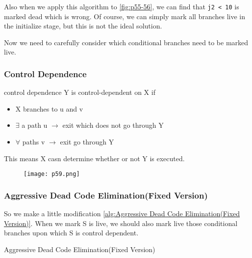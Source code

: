 Also when we apply this algorithm to \ref{fig:p55-56}, we can find that \texttt{j2 < 10} is marked dead which is wrong. Of course,
we can simply mark all branches live in the initialize stage, but this is not the ideal solution.


Now we need to carefully consider which conditional branches need to be marked live. 



\subsubsection{Control Dependence}

\begin{definition}{control dependence}
Y is control-dependent on X if
\begin{itemize}
    \item X branches to u and v 
    \item $\exists$ a path u $\rightarrow$ exit which does not go through Y 
    \item $\forall$ paths v  $\rightarrow$ exit go through Y
\end{itemize}    
This means X casn determine whether or not Y is executed.
\begin{figure}[H]
    \centering
     \texttt{[image: p59.png]}
    
\end{figure}
\end{definition}


\subsubsection{Aggressive Dead Code Elimination(Fixed Version)}

So we make a little modification \ref{alg:Aggressive Dead Code Elimination(Fixed Version)}. When we mark S is live, we should also mark live those conditional branches upon which S is 
control dependent.

\begin{algorithm}[H]
    \caption{Aggressive Dead Code Elimination(Fixed Version)}\label{alg:Aggressive Dead Code Elimination(Fixed Version)}
    \begin{algorithmic}
        \EndIf
    \EndWhile
    \EndFunction
    \end{algorithmic}
    \end{algorithm}




